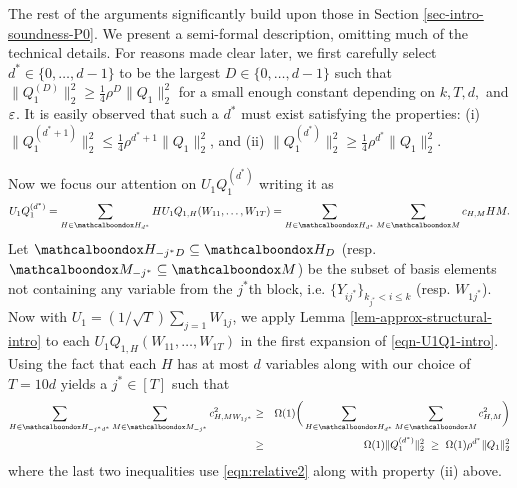 The rest of the arguments significantly build upon those in Section
\ref{sec-intro-soundness-P0}. We present a semi-formal description,
omitting much of the technical details. For
 reasons made clear later, we first 
carefully select $d^* \in \{0,\dots, d-1\}$ to be
the largest $D \in \{0,\dots, d-1\}$ such that $\|Q_1^{(D)}\|_2^2 \geq
\frac14\rho^D\|Q_1\|_2^2$ for a small enough constant depending on $k,T,
d,$ and $\varepsilon$. It is easily observed that such a $d^*$ must exist
satisfying the properties: (i) $\|Q_1^{(d^*+1)}\|_2^2 \leq \frac14\rho^{d^* + 1} 
\|Q_1\|_2^2$, and (ii) $\|Q_1^{(d^*)}\|_2^2 \geq \frac14\rho^{d^*}\|Q_1\|_2^2$. 

Now we focus our attention on $U_1Q_1^{(d^*)}$ writing it as
\begin{equation}\label{eqn-U1Q1-intro}
U_1Q_1^{(d^*)} = \sum_{H \in \mcb{H}_{d^*}} HU_1Q_{1,H}(W_{11},\dots,
W_{1T}) = \sum_{H\in \mcb{H}_{d^*}}\sum_{M \in \mcb{M}}c_{H,M}HM.
\end{equation}
Let $\mcb{H}_{-j^*D}\subseteq \mcb{H}_{D}$ (resp.
$\mcb{M}_{-j^*} \subseteq \mcb{M}$) be the subset of basis elements
not containing any
variable from the $j^*$th block, i.e. $\{Y_{ij^*}\}_{k_{j^*}<i\leq k}$
(resp. $W_{1j^*}$). 
Now with $U_1 = (1/\sqrt{T})\sum_{j=1}W_{1j}$, we 
apply Lemma  \ref{lem-approx-structural-intro}
to each $U_1Q_{1,H}(W_{11},\dots, W_{1T})$ in the first expansion of
\eqref{eqn-U1Q1-intro}.
Using the fact that each $H$ has at most $d$
variables along with our choice of $T = 10d$ yields a $j^* \in [T]$
such that 
\begin{eqnarray}
\sum_{H \in \mcb{H}_{-j^*d^*}}\sum_{M \in \mcb{M}_{-j^*}}
c^2_{H,MW_{1j^*}} & \geq & \Omega(1)\bigg(\sum_{H \in \mcb{H}_{d^*}}\sum_{M
\in \mcb{M}} c^2_{H,M}\bigg) \label{eqn-lemma-apply-intro-1}\\
& \geq & \Omega(1)\|Q_1^{(d^*)}\|_2^2\ \geq\ \Omega(1)\rho^{d^*} \|Q_1\|_2^2
\label{eqn-lemma-apply-intro-2}
\end{eqnarray}
where the last two inequalities use
\eqref{eqn:relative2} along
with property (ii) above.

